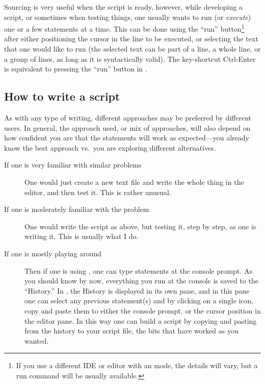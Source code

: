 \documentclass[krantz2]{krantz}\usepackage{knitr}
\begin{document}
Sourcing is very useful when the script is ready, however, while developing a script, or sometimes when testing things, one usually wants to run (or \emph{execute}) one or a few statements at a time. This can be done using the ``run'' button\footnote{If you use a different IDE or editor with an \Rlang mode, the details will vary, but a run command will be usually available.} after either positioning the cursor in the line to be executed, or selecting the text that one would like to run (the selected text can be part of a line, a whole line, or a group of lines, as long as it is syntactically valid). The key-shortcut Ctrl-Enter is equivalent to pressing the ``run'' button in \RStudio.

\subsection{How to write a script}\label{sec:script:writing}

As with any type of writing, different approaches may be preferred by different \Rlang users. In general, the approach used, or mix of approaches, will also depend on how confident you are that the statements will work as expected---you already know the best approach vs.\ you are exploring different alternatives.
\begin{description}
\item[If one is very familiar with similar problems] One would just create a new text file and write the whole thing in the editor, and then test it. This is rather unusual.
\item[If one is moderately familiar with the problem] One would write the script as above, but testing it, step by step, as one is writing it. This is usually what I do.
\item[If one is mostly playing around] Then if one is using \RStudio, one can type statements at the console prompt. As you should know by now, everything you run at the console is saved to the ``History.'' In \RStudio, the History is displayed in its own pane, and in this pane one can select any previous statement(s) and by clicking on a single icon, copy and paste them to either the \Rlang console prompt, or the cursor position in the editor pane. In this way one can build a script by copying and pasting from the history to your script file, the bits that have worked as you wanted.
\end{description}
\end{document}
